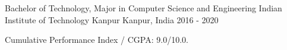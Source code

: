 

  \cventry
    {Bachelor of Technology, Major in Computer Science and Engineering}
    {Indian Institute of Technology Kanpur}
    {Kanpur, India}
    {2016 - 2020}
    {
      \begin{cvitems}
        \item Cumulative Performance Index / CGPA: 9.0/10.0.
      \end{cvitems}
    }

